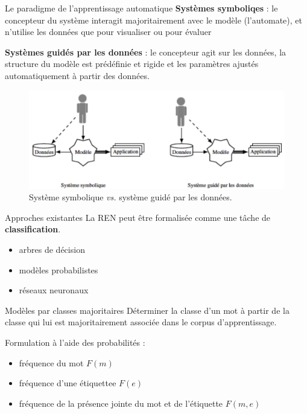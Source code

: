 \documentclass[xetex,xcolor={table,usenames,dvipsnames}]{beamer}
\newcommand{\bolder}[1]{{\color{purple}\bfseries#1}}
\begin{document}
\begin{frame}{Le paradigme de l'apprentissage automatique}
	\bolder{Systèmes symboliqes} : le concepteur du système interagit majoritairement avec le modèle (l'automate), et n'utilise les données que pour visualiser ou pour évaluer
	
	\bolder{Systèmes guidés par les données} : le concepteur agit sur les données, la structure du modèle est prédéfinie et rigide et les paramètres ajustés automatiquement à partir des données.
	
				\begin{figure}[h] %
		\centering
		\includegraphics[width=.7\linewidth]{img/paradigme_apprentissage.png}
		\caption{Système symbolique \textit{vs.} système guidé par les données.}
		\label{fig:ling_out_TAL}
	\end{figure}
\end{frame}

\begin{frame}{Approches existantes}
	La \textsc{REN} peut être formalisée comme une tâche de \bolder{classification}.
	
	\begin{itemize}
		\item arbres de décision
		\item modèles probabilistes
		\item réseaux neuronaux
	\end{itemize}
\end{frame}

\begin{frame}{Modèles par classes majoritaires}
	Déterminer la classe d'un mot à partir de la classe qui lui est majoritairement associée dans le corpus d'apprentissage.
	
	Formulation à l'aide des probabilités :
	\begin{itemize}
		\item fréquence du mot $F(m)$
		\item fréquence d'une étiquettee $F(e)$
		\item fréquence de la présence jointe du mot et de l'étiquette $F(m,e)$
		\end{itemize}
\end{frame}
\end{document}
